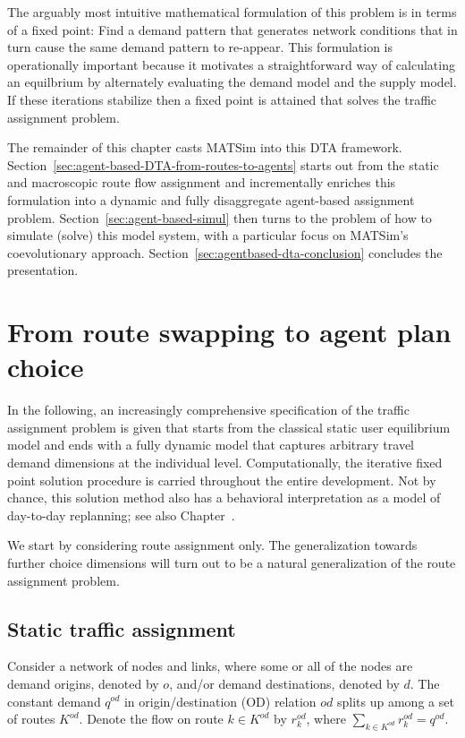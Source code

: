 The arguably most intuitive mathematical formulation of this problem is 
in terms of a fixed point: Find a demand pattern that generates network 
conditions that in turn cause the same demand pattern to re-appear. This 
formulation is operationally important because it motivates a straightforward 
way of calculating an equilbrium by alternately evaluating the demand 
model and the supply model. If these iterations stabilize then a fixed 
point is attained that solves the traffic assignment problem.

The remainder of this chapter casts MATSim into this DTA framework.
Section~\ref{sec:agent-based-DTA-from-routes-to-agents} starts out from the
static and macroscopic route flow assignment and incrementally enriches this 
formulation into a dynamic and fully disaggregate agent-based assignment problem.
Section~\ref{sec:agent-based-simul} then turns to the problem of how to
simulate (solve) this model system, with a particular focus on MATSim's
coevolutionary approach. Section~\ref{sec:agentbased-dta-conclusion} concludes
the presentation.


\section{\label{sec:agent-based-DTA-from-routes-to-agents}From route swapping to agent plan choice}

In the following, an increasingly comprehensive specification of the traffic 
assignment problem is given that starts from the classical static user 
equilibrium model and ends with a fully dynamic model that captures 
arbitrary travel demand dimensions at the individual level. Computationally, 
the iterative fixed point solution procedure is carried throughout the 
entire development. Not by chance, this solution method also has a behavioral 
interpretation as a model of day-to-day replanning; see also Chapter~.

We start by considering route assignment only. The generalization towards further 
choice dimensions will turn out to be a natural generalization of the route assignment problem.

\subsection{\label{static-macro-assignment}Static traffic assignment}

Consider a network of nodes and links, where some or all of the nodes are demand origins, 
denoted by $o$, and/or demand destinations, denoted by $d$. 
The constant demand $q^{od}$ in origin/destination (OD) relation $od$ splits up among a set of routes $K^{od}$. 
Denote the flow on route $k\in K^{od}$ by $r^{od}_k$, where $\sum_{k\in K^{od}} r^{od}_k = q^{od}$.

